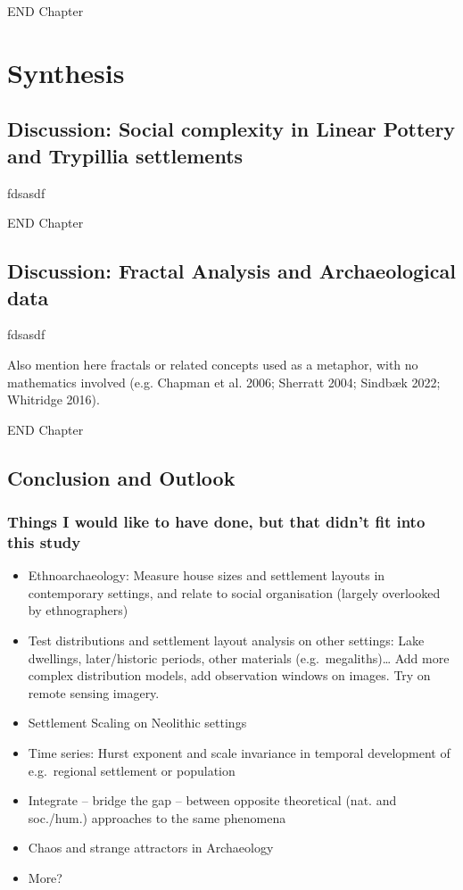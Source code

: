 \documentclass[
  12pt,
]{book}
\providecommand{\tightlist}{%
  \setlength{\itemsep}{0pt}\setlength{\parskip}{0pt}}
\begin{document}
END Chapter

\hypertarget{part-synthesis}{%
\part{Synthesis}\label{part-synthesis}}

\hypertarget{disc-results}{%
\chapter{Discussion: Social complexity in Linear Pottery and Trypillia settlements}\label{disc-results}}

fdsasdf

END Chapter

\hypertarget{disc-methods}{%
\chapter{Discussion: Fractal Analysis and Archaeological data}\label{disc-methods}}

fdsasdf

Also mention here fractals or related concepts used as a metaphor, with no mathematics involved (e.g. Chapman et al. 2006; Sherratt 2004; Sindbæk 2022; Whitridge 2016).

END Chapter

\hypertarget{conclusion}{%
\chapter{Conclusion and Outlook}\label{conclusion}}

\hypertarget{things-i-would-like-to-have-done-but-that-didnt-fit-into-this-study}{%
\section{Things I would like to have done, but that didn't fit into this study}\label{things-i-would-like-to-have-done-but-that-didnt-fit-into-this-study}}

\begin{itemize}
\tightlist
\item
  Ethnoarchaeology: Measure house sizes and settlement layouts in contemporary settings, and relate to social organisation (largely overlooked by ethnographers)
\item
  Test distributions and settlement layout analysis on other settings: Lake dwellings, later/historic periods, other materials (e.g.~megaliths)\ldots{} Add more complex distribution models, add observation windows on images. Try on remote sensing imagery.
\item
  Settlement Scaling on Neolithic settings
\item
  Time series: Hurst exponent and scale invariance in temporal development of e.g.~regional settlement or population
\item
  Integrate -- bridge the gap -- between opposite theoretical (nat. and soc./hum.) approaches to the same phenomena
\item
  Chaos and strange attractors in Archaeology
\item
  More?
\end{itemize}
\end{document}
